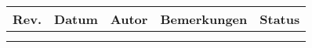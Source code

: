 
\begin{tabularx}{\textwidth}{|r|r|l|X|l|}
\hline
\textbf{Rev.} & \textbf{Datum} & \textbf{Autor} & \textbf{Bemerkungen} & \textbf{Status}  \\ 
\hline
&                &                &                      &                  \\ 
\hline
&                &                &                      &                  \\
\hline
\end{tabularx}